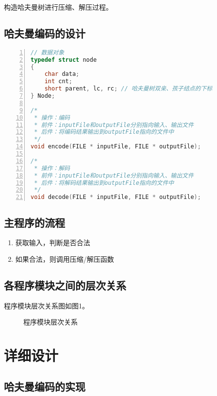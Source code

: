 \documentclass{article}
\begin{document}
构造哈夫曼树进行压缩、解压过程。

\subsection{哈夫曼编码的设计}

\begin{lstlisting}[language={C},
    numbers=left,
    numberstyle=\tiny\consolas,
    basicstyle=\small\consolas]
// 数据对象
typedef struct node
{
    char data;
    int cnt;
    short parent, lc, rc; // 哈夫曼树双亲、孩子结点的下标
} Node;

/*
 * 操作：编码
 * 前件：inputFile和outputFile分别指向输入、输出文件
 * 后件：将编码结果输出到outputFile指向的文件中
 */
void encode(FILE * inputFile, FILE * outputFile);

/*
 * 操作：解码
 * 前件：inputFile和outputFile分别指向输入、输出文件
 * 后件：将解码结果输出到outputFile指向的文件中
 */
void decode(FILE * inputFile, FILE * outputFile);
\end{lstlisting}

\subsection{主程序的流程}

\begin{enumerate}
    \item 获取输入，判断是否合法
    \item 如果合法，则调用压缩/解压函数
\end{enumerate}

\subsection{各程序模块之间的层次关系}

程序模块层次关系图如图1。

\begin{figure}[htbp]


    \caption{程序模块层次关系}

\end{figure}

\section{详细设计}

\subsection{哈夫曼编码的实现}
\end{document}
